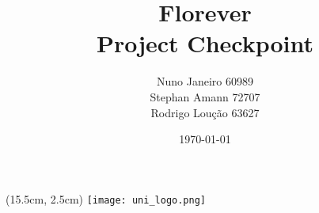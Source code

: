 \documentclass[a4paper,12pt]{article}
\title{\textbf{Florever}\\\large Project Checkpoint}
\author{Nuno Janeiro 60989 \\
 Stephan Amann  72707 \\
 Rodrigo Loução 63627 }
\date{\today}
\begin{document}
\begin{textblock*}{2.5cm}(15.5cm, 2.5cm) %
    \texttt{[image: uni\_logo.png]}
\end{textblock*}

\maketitle
\end{document}
